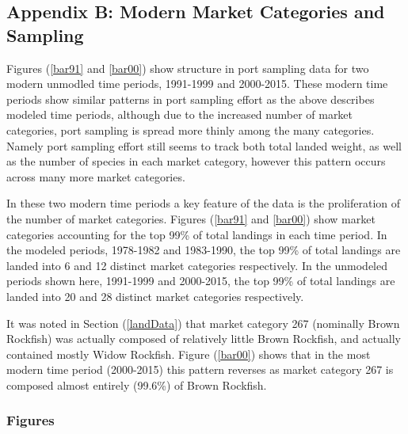\documentclass[12pt]{article}
\begin{document}
%
\subsection{Appendix B: Modern Market Categories and Sampling}\label{appData}

Figures (\ref{bar91} and \ref{bar00}) show structure in port sampling data for 
two modern unmodled time periods, 1991-1999 and 2000-2015. These modern 
time periods show similar patterns in port sampling effort as the 
above describes modeled time periods, although due to the increased number 
of market categories, port sampling is spread more thinly among the 
many categories. Namely port sampling effort still seems to track both 
total landed weight, as well as the number of species in each market 
category, however this pattern occurs across many more market categories.

In these two modern time periods a key feature of the data is the
proliferation of the number of market categories. Figures (\ref{bar91} and 
\ref{bar00}) show market categories accounting for the top 99\% of total
landings in each time period. In the modeled periods, 1978-1982 and
1983-1990, the top 99\% of total landings are landed into 6 and 12
distinct market categories respectively. In the unmodeled periods shown
here, 1991-1999 and 2000-2015, the top 99\% of total landings are landed
into 20 and 28 distinct market categories respectively.

It was noted in Section (\ref{landData}) that market category 267 (nominally 
Brown Rockfish) was actually composed of relatively little Brown Rockfish, 
and actually contained mostly Widow Rockfish. Figure (\ref{bar00}) shows that 
in the most modern time period (2000-2015) this pattern reverses as market 
category 267 is composed almost entirely (99.6\%) of Brown Rockfish.

\subsubsection{Figures}

%
\clearpage
%
\end{document}

